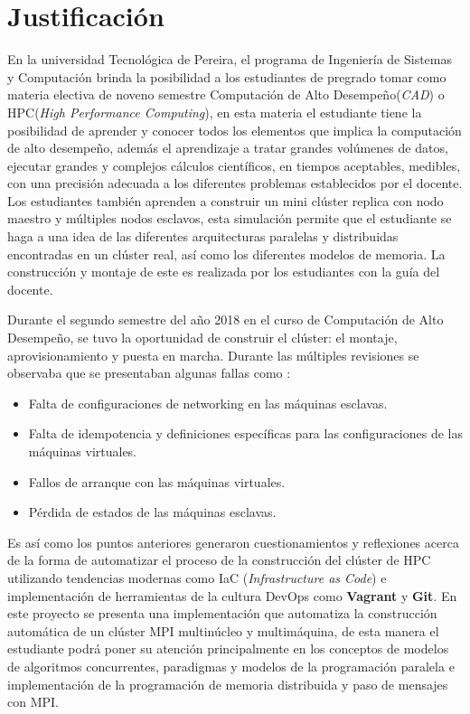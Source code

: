 \documentclass[letterpaper, 12pt, oneside]{article}
\begin{document}
    \section{Justificación}
    En la universidad Tecnológica de Pereira, el programa de Ingeniería de Sistemas y Computación brinda la posibilidad a los estudiantes de pregrado tomar como materia electiva de noveno semestre Computación de Alto Desempeño(\textit{CAD}) o HPC(\textit{High Performance Computing}), en esta materia el estudiante tiene la posibilidad de aprender y conocer todos los elementos que implica la computación de alto desempeño, además el aprendizaje a tratar grandes volúmenes de datos, ejecutar grandes y complejos cálculos científicos, en tiempos aceptables, medibles, con una precisión adecuada a los diferentes problemas establecidos por el docente. Los estudiantes también aprenden a construir un mini clúster replica con nodo maestro y múltiples nodos esclavos, esta simulación permite que el estudiante se haga a una idea de las diferentes arquitecturas paralelas y distribuidas encontradas en un clúster real, así como los diferentes modelos de memoria. La construcción y montaje de este es realizada por los estudiantes con la guía del docente. 
    
    Durante el segundo semestre del año 2018 en el curso de Computación de Alto Desempeño, se tuvo la oportunidad de construir el clúster: el montaje, aprovisionamiento y puesta en marcha. Durante las múltiples revisiones se observaba que se presentaban algunas fallas como : 
    
    \begin{itemize}
        \item Falta de configuraciones de networking en las máquinas esclavas.
        \item Falta de idempotencia y definiciones específicas para las configuraciones de las máquinas virtuales.
        \item Fallos de arranque con las máquinas virtuales.
        \item Pérdida de estados de las máquinas esclavas.
    \end{itemize}
    
    Es así como los puntos anteriores generaron cuestionamientos y reflexiones acerca de la forma de automatizar el proceso de la construcción del clúster de HPC utilizando tendencias modernas como IaC (\textit{Infrastructure as Code}) e implementación de herramientas de la cultura DevOps como \textbf{Vagrant} y \textbf{Git}. 
    En  este  proyecto  se  presenta  una  implementación que automatiza la construcción automática de un clúster MPI multinúcleo y multimáquina, de esta manera el estudiante podrá poner su atención principalmente en los conceptos de modelos de algoritmos concurrentes, paradigmas y modelos de la programación paralela e implementación de la programación de memoria distribuida y paso de mensajes con MPI. 
    
\end{document}
